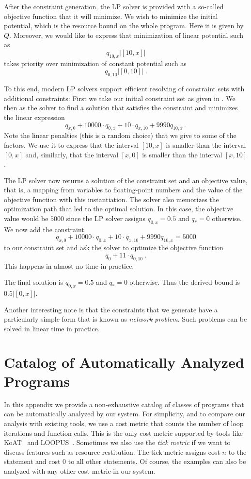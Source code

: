 \documentclass[nocopyrightspace,preprint]{sigplanconf}
\newcommand{\pref}[1]{\prettyref{#1}}
\begin{document}
{After the constraint generation, the LP solver is provided with a
so-called objective function that it will minimize.  We wish to
minimize the initial potential, which is the resource bound on the
whole program.  Here it is given by $Q$.  Moreover, we would like to
express that minimization of linear potential such as
$$
q_{10,x} |[10,x]|
$$
takes priority over minimization of constant potential such as
$$
q_{0,10} |[0,10]| \; .
$$

To this end, modern LP solvers support efficient resolving of
constraint sets with additional constraints: First we take our initial
constraint set as given in \pref{fig:derivation}.  We then as the
solver to find a solution that satisfies the constraint and minimizes
the linear expression
$$
q_{x,0} + 10000{\cdot}q_{0,x} + 10{\cdot}q_{x,10} + 9990q_{10,x} \; .
$$
Note the linear penalties (this is a random choice) that we give to
some of the factors.  We use it to express that the interval $[10,x]$
is smaller than the interval $[0,x]$ and, similarly, that the interval
$[x,0]$ is smaller than the interval $[x,10]$.

The LP solver now returns a solution of the constraint set and an
objective value, that is, a mapping from variables to floating-point
numbers and the value of the objective function with this
instantiation.  The solver also memorizes the optimization path that
led to the optimal solution.  In this case, the objective value would
be
$
5000
$
since the LP solver assigns $q_{0,x} = 0.5$ and $q_{*} = 0$ otherwise.
We now add the constraint
$$
q_{x,0} + 10000{\cdot}q_{0,x} + 10{\cdot}q_{x,10} + 9990q_{10,x} = 5000
$$
to our constraint set and ask the solver to optimize the objective
function
$$
q_0 + 11{\cdot}q_{0,10} \; .
$$
This happens in almost no time in practice.

The final solution is $q_{0,x} = 0.5$ and $q_{*} = 0$ otherwise.  Thus
the derived bound is $0.5 |[0,x]|$.

Another interesting note is that the constraints that we generate have
a particularly simple form that is known as \emph{network problem}.
Such problems can be solved in linear time in practice.

\newpage

\section{Catalog of Automatically Analyzed Programs}
\label{app:cat}

In this appendix we provide a non-exhaustive catalog of classes of
programs that can be automatically analyzed by our system.  For
simplicity, and to compare our analysis with existing tools, we use a
cost metric that counts the number of loop iterations and function
calls.  This is the only cost metric supported by tools like
KoAT~\cite{BrockschmidtEFFG14} and LOOPUS~\cite{SinnZV14}.  Sometimes
we also use the \emph{tick metric} if we want to discuss features such as
resource restitution.  The tick metric assigns cost $n$ to the
statement  and cost $0$ to all other statements. Of
course, the examples can also be analyzed with any other cost metric
in our system.

}
\end{document}
